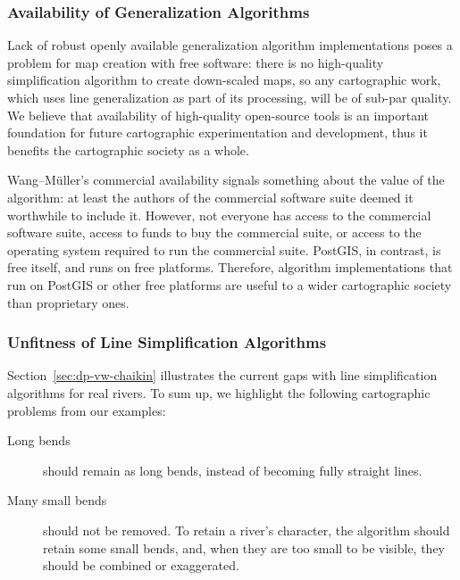\documentclass[a4paper]{article}
\newcommand{\WM}{Wang--M{\"u}ller}
\begin{document}
\subsubsection{Availability of Generalization Algorithms}

Lack of robust openly available generalization algorithm implementations poses
a problem for map creation with free software: there is no high-quality
simplification algorithm to create down-scaled maps, so any cartographic work,
which uses line generalization as part of its processing, will be of sub-par
quality. We believe that availability of high-quality open-source tools is an
important foundation for future cartographic experimentation and development,
thus it benefits the cartographic society as a whole.

{\WM}'s commercial availability signals something about the value of the
algorithm: at least the authors of the commercial software suite deemed it
worthwhile to include it. However, not everyone has access to the commercial
software suite, access to funds to buy the commercial suite, or access to the
operating system required to run the commercial suite. PostGIS, in contrast, is
free itself, and runs on free platforms. Therefore, algorithm
implementations that run on PostGIS or other free platforms are useful to a
wider cartographic society than proprietary ones.

\subsubsection{Unfitness of Line Simplification Algorithms}

Section~\ref{sec:dp-vw-chaikin} illustrates the current gaps with line
simplification algorithms for real rivers. To sum up, we highlight the
following cartographic problems from our examples:

\begin{description}

    \item[Long bends] should remain as long bends, instead of becoming fully
        straight lines.

    \item[Many small bends] should not be removed. To retain a river's character,
        the algorithm should retain some small bends, and, when they are too
        small to be visible, they should be combined or exaggerated.

\end{description}
\end{document}
